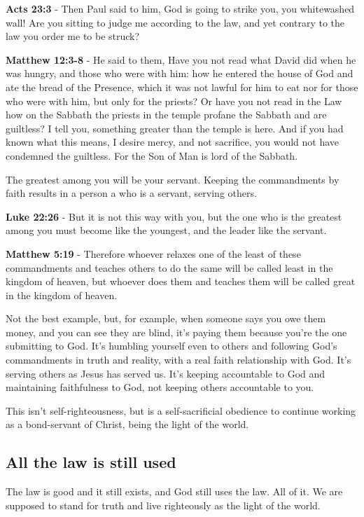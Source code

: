 \documentclass[11pt]{article}
\begin{document}
\textbf{Acts 23:3} - Then Paul said to him, God is going to strike you, you whitewashed wall! Are you sitting to judge me according to the law, and yet contrary to the law you order me to be struck?

\textbf{Matthew 12:3-8} - He said to them, Have you not read what David did when he was hungry, and those who were with him: how he entered the house of God and ate the bread of the Presence, which it was not lawful for him to eat nor for those who were with him, but only for the priests?  Or have you not read in the Law how on the Sabbath the priests in the temple profane the Sabbath and are guiltless?  I tell you, something greater than the temple is here.  And if you had known what this means, I desire mercy, and not sacrifice, you would not have condemned the guiltless.  For the Son of Man is lord of the Sabbath.

The greatest among you will be your servant.
Keeping the commandments by faith results in a person a who is a servant, serving others.

\textbf{Luke 22:26} - But it is not this way with you, but the one who is the greatest among you must become like the youngest, and the leader like the servant.

\textbf{Matthew 5:19} - Therefore whoever relaxes one of the least of these commandments and teaches others to do the same will be called least in the kingdom of heaven, but whoever does them and teaches them will be called great in the kingdom of heaven.

Not the best example, but, for example, when someone says you owe them money, and you can see they are blind, it's paying them because you're the one submitting to God.
It's humbling yourself even to others and following God's commandments in truth and reality, with a real faith relationship with God.
It's serving others as Jesus has served us.
It's keeping accountable to God and maintaining faithfulness to God, not keeping others accountable to you.

This isn't self-righteousness, but is a self-sacrificial obedience to continue working as a bond-servant of Christ, being the light of the world.

\subsection{All the law is still used}
\label{sec:org33455f1}
The law is good and it still exists, and God still uses the law. All of it. We are supposed to stand for truth and live righteously as the light of the world.
\end{document}
